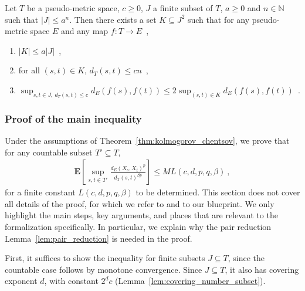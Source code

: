 \documentclass[lean]{Draft}
\makeatletter
\newcommand\leanlink{\begingroup\catcode`\#=12\relax\@leanlink}
\newcommand\@leanlink[2]{\endgroup
\href{#1}
{\texttt{\detokenize{#2}}}}
\newcommand{\mllink}[3]{%
\leanlink{https://github.com/leanprover-community/mathlib4/blob/6135ffb78e8bcd3fcc8ec02f3f82ea0b0737358b/Mathlib/#1.lean\##2}
{#3}}
\makeatother
\begin{document}
\begin{lemma}[\cite{kratschmer2023kolmogorov} Lemma 6.1, extension of \cite{talagrand2014}, B.2.7, \mllink{Topology/EMetricSpace/PairReduction}{L471-L485}{EMetric.pair_reduction}]\label{lem:pair_reduction}
Let $T$ be a pseudo-metric space, $c \ge 0$, $J$ a finite subset of $T$, $a \ge 0$ and $n \in \mathbb{N}$ such that $\lvert J \rvert \le a^n$.
Then there exists a set $K \subseteq J^2$ such that for any pseudo-metric space $E$ and any map $f: T \to E$~,
\begin{enumerate}
  \item $\lvert K \rvert \le a \lvert J \rvert$~,
  \item for all $(s, t) \in K$, $d_T(s, t) \le cn$~,
  \item $\sup_{s, t \in J, \: d_T(s, t) \le c} d_E(f(s), f(t)) \le 2 \sup_{(s, t) \in K} d_E(f(s), f(t))$~.
\end{enumerate}
\end{lemma}


\subsubsection{Proof of the main inequality}

Under the assumptions of Theorem~\ref{thm:kolmogorov_chentsov}, we prove that for any countable subset $T' \subseteq T$,
\begin{align*}
  \mathbf{E}\left[ \sup_{s, t \in T'} \frac{d_E(X_s, X_t)^p}{d_T(s, t)^{\beta p}} \right]
  \le M L(c, d, p, q, \beta)
  \: ,
\end{align*}
for a finite constant $L(c, d, p, q, \beta)$ to be determined.
This section does not cover all details of the proof, for which we refer to \cite{kratschmer2023kolmogorov} and to our blueprint. We only highlight the main steps, key arguments, and places that are relevant to the formalization specifically.
In particular, we explain why the pair reduction Lemma~\ref{lem:pair_reduction} is needed in the proof.

First, it suffices to show the inequality for finite subsets $J \subseteq T$, since the countable case follows by monotone convergence.
Since $J \subseteq T$, it also has covering exponent $d$, with constant $2^d c$ (Lemma~\ref{lem:covering_number_subset}).
\end{document}
